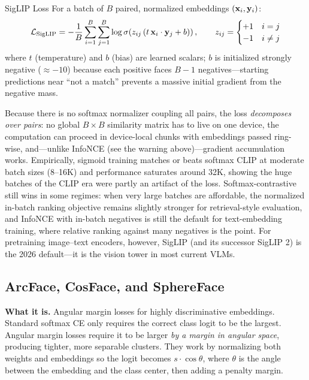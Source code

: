 \begin{mathresult}{SigLIP Loss}
For a batch of $B$ paired, normalized embeddings $(\mathbf{x}_i, \mathbf{y}_i)$:
\begin{equation}
\mathcal{L}_{\text{SigLIP}} = -\frac{1}{B} \sum_{i=1}^{B} \sum_{j=1}^{B} \log \sigma\!\left( z_{ij} \left( t \, \mathbf{x}_i \cdot \mathbf{y}_j + b \right) \right), \qquad z_{ij} = \begin{cases} +1 & i = j \\ -1 & i \neq j \end{cases}
\end{equation}
where $t$ (temperature) and $b$ (bias) are learned scalars; $b$ is initialized strongly negative ($\approx -10$) because each positive faces $B-1$ negatives---starting predictions near ``not a match'' prevents a massive initial gradient from the negative mass.
\end{mathresult}

Because there is no softmax normalizer coupling all pairs, the loss \textit{decomposes over pairs}: no global $B \times B$ similarity matrix has to live on one device, the computation can proceed in device-local chunks with embeddings passed ring-wise, and---unlike InfoNCE (see the warning above)---gradient accumulation works. Empirically, sigmoid training matches or beats softmax CLIP at moderate batch sizes (8--16K) and performance saturates around 32K, showing the huge batches of the CLIP era were partly an artifact of the loss. Softmax-contrastive still wins in some regimes: when very large batches are affordable, the normalized in-batch ranking objective remains slightly stronger for retrieval-style evaluation, and InfoNCE with in-batch negatives is still the default for text-embedding training, where relative ranking against many negatives is the point. For pretraining image--text encoders, however, SigLIP (and its successor SigLIP 2) is the 2026 default---it is the vision tower in most current VLMs.

\subsection{ArcFace, CosFace, and SphereFace}

\textbf{What it is.} Angular margin losses for highly discriminative embeddings. Standard softmax CE only requires the correct class logit to be the largest. Angular margin losses require it to be larger \textit{by a margin in angular space}, producing tighter, more separable clusters. They work by normalizing both weights and embeddings so the logit becomes $s \cdot \cos\theta$, where $\theta$ is the angle between the embedding and the class center, then adding a penalty margin.

